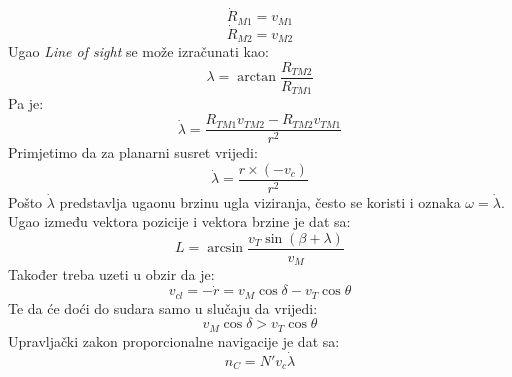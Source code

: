 \begin{equation}
    \dot{R}_{M1}=v_{M1}
\end{equation}
\begin{equation}
    \dot{R}_{M2}=v_{M2}
\end{equation}
Ugao \textit{Line of sight} se može izračunati kao:
\begin{equation}
    \lambda = \arctan{\frac{R_{TM2}}{R_{TM1}}}
\end{equation}
Pa je: 
\begin{equation}
    \dot{\lambda}=\frac{R_{TM1}v_{TM2}-R_{TM2}v_{TM1}}{r^2}
\end{equation}
Primjetimo da za planarni susret vrijedi:
\begin{equation}
    \dot{\lambda}=\frac{r\times (-v_c)}{r^2}
\end{equation}
Pošto $\dot{\lambda}$ predstavlja ugaonu brzinu ugla viziranja, često se koristi i oznaka 
$\omega = \dot{\lambda}$.
Ugao između vektora pozicije i vektora brzine je dat sa:
\begin{equation}
    L=\arcsin{\frac{v_T\sin{(\beta+\lambda)}}{v_M}}
\end{equation}
Također treba uzeti u obzir da je:
\begin{equation}
    v_{cl}=-\dot{r}=v_M\cos\delta - v_T\cos\theta
\end{equation}
Te da će doći do sudara samo u slučaju da vrijedi: 
\begin{equation}
    v_M\cos\delta > v_T\cos\theta
\end{equation}
Upravljački zakon proporcionalne navigacije je dat sa:
\begin{equation}
    n_C=N'v_c\dot{\lambda}
\end{equation}

